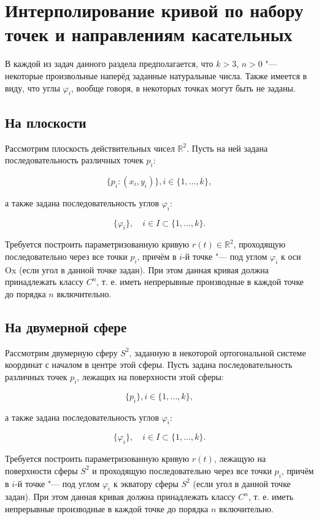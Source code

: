 \section{Интерполирование кривой по набору точек и направлениям касательных}

В каждой из задач данного раздела предполагается, что $k>3$, $n>0$ "--- некоторые произвольные наперёд заданные
натуральные числа. Также имеется в виду, что углы $\varphi_i$, вообще говоря, в некоторых точках могут быть не заданы.

\subsection*{На плоскости}

Рассмотрим плоскость действительных чисел $\mathbb{R}^2$. Пусть на ней задана последовательность различных точек
$p_i$:

$$\{p_i: (x_i, y_i)\}, i \in \{1, \dots, k\},$$

\noindent а также задана последовательность углов $\varphi_i$:

$$\{\varphi_i\}, \quad i \in I \subset \{1, \dots, k\}.$$

Требуется построить параметризованную кривую $r(t) \in \mathbb{R}^2$, проходящую последовательно через все точки
$p_i$, причём в $i$-й точке "--- под углом $\varphi_i$ к оси Ox (если угол в данной точке задан). При этом данная кривая
должна принадлежать классу $C^n$, т. е. иметь непрерывные производные в каждой точке до порядка $n$ включительно.

\subsection*{На двумерной сфере}

Рассмотрим двумерную сферу $S^2$, заданную в некоторой ортогональной системе координат с началом в центре этой сферы.
Пусть задана последовательность различных точек $p_i$, лежащих на поверхности этой сферы:

$$\{p_i\}, i \in \{1, \dots, k\},$$

\noindent а также задана последовательность углов $\varphi_i$:

$$\{\varphi_i\}, \quad i \in I \subset \{1, \dots, k\}.$$

Требуется построить параметризованную кривую $r(t)$, лежащую на поверхности сферы $S^2$ и проходящую последовательно
через все точки $p_i$, причём в $i$-й точке "--- под углом $\varphi_i$ к экватору сферы $S^2$ (если угол в данной точке
задан). При этом данная кривая должна принадлежать классу $C^n$, т. е. иметь непрерывные производные в каждой точке
до порядка $n$ включительно.

